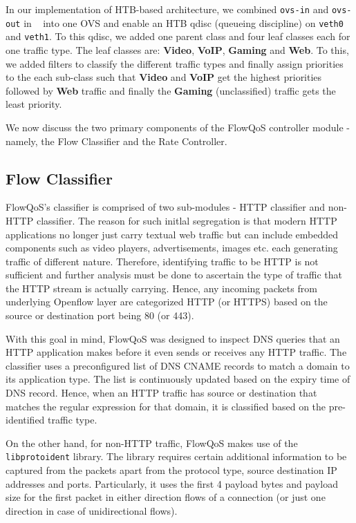 In our implementation of HTB-based architecture, we combined \texttt{ovs-in} and \texttt{ovs-out} in ~ into one OVS and enable an HTB qdisc (queueing discipline) on \texttt{veth0} and \texttt{veth1}. To this qdisc, we added one parent class and four leaf classes each for one traffic type. The leaf classes are: \textbf{Video}, \textbf{VoIP}, \textbf{Gaming} and \textbf{Web}. To this, we added filters to classify the different traffic types and finally assign priorities to the each sub-class such that \textbf{Video} and \textbf{VoIP} get the highest priorities followed by \textbf{Web} traffic and finally the \textbf{Gaming} (unclassified) traffic gets the least priority.

We now discuss the two primary components of the FlowQoS controller module - namely, the Flow Classifier and the Rate Controller.

\subsection{Flow Classifier}
FlowQoS's classifier is comprised of two sub-modules - HTTP classifier and non-HTTP classifier. The reason for such initlal segregation is that modern HTTP applications no longer just carry textual web traffic but can include embedded components such as video players, advertisements, images etc. each generating traffic of different nature.
Therefore, identifying traffic to be HTTP is not sufficient and further analysis must be done to ascertain the type of traffic that the HTTP stream is actually carrying. Hence, any incoming packets from underlying Openflow layer are categorized HTTP (or HTTPS) based on the source or destination port being 80 (or 443).

With this goal in mind, FlowQoS was designed to inspect DNS queries that an HTTP application makes before it even sends or receives any HTTP traffic. The classifier uses a preconfigured list of DNS CNAME records to match a domain to its application type. The list is continuously updated based on the expiry time of DNS record. Hence, when an HTTP traffic has source or destination that matches the regular expression for that domain, it is classified based on the pre-identified traffic type.

On the other hand, for non-HTTP traffic, FlowQoS makes use of the \texttt{libprotoident} \cite{flow_web} library. The library requires certain additional information to be captured from the packets apart from the protocol type, source destination IP addresses and ports. Particularly, it uses the first 4 payload bytes and payload size for the first packet in either direction flows of a connection (or just one direction in case of unidirectional flows).

